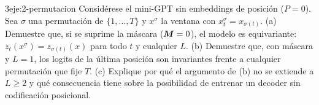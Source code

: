 \begin{ejercicio}{3}{eje:2-permutacion}
Considérese el mini-GPT sin embeddings de posición ($P=0$). Sea $\sigma$ una permutación de $\{1,\dots,T\}$ y $x^{\sigma}$ la ventana con $x^{\sigma}_t=x_{\sigma(t)}$. (a) Demuestre que, si se suprime la máscara ($\bm{M}=0$), el modelo es equivariante: $z_t(x^{\sigma})=z_{\sigma(t)}(x)$ para todo $t$ y cualquier $L$. (b) Demuestre que, con máscara y $L=1$, los logits de la última posición son invariantes frente a cualquier permutación que fije $T$. (c) Explique por qué el argumento de (b) no se extiende a $L\ge 2$ y qué consecuencia tiene sobre la posibilidad de entrenar un decoder sin codificación posicional.
\end{ejercicio}
